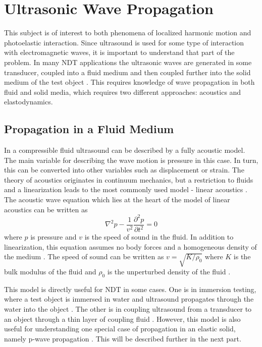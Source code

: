 \documentclass[11pt,twoside]{eitExjobb}
\begin{document}
	\section{Ultrasonic Wave Propagation}
	This subject is of interest to both phenomena of localized harmonic motion and photoelastic interaction. Since ultrasound is used for some type of interaction with electromagnetic waves, it is important to understand that part of the problem. In many NDT applications the ultrasonic waves are generated in some transducer, coupled into a fluid medium and then coupled further into the solid medium of the test object \cite{Schmerr2016}. This requires knowledge of wave propagation in both fluid and solid media, which requires two different approaches: acoustics and elastodynamics.
	
	\subsection{Propagation in a Fluid Medium}
	In a compressible fluid ultrasound can be described by a fully acoustic model. The main variable for describing the wave motion is pressure in this case. In turn, this can be converted into other variables such as displacement or strain. The theory of acoustics originates in continuum mechanics, but a restriction to fluids and a linearization leads to the most commonly used model - linear acoustics \cite{Rossing2014}. The acoustic wave equation which lies at the heart of the model of linear acoustics can be written as \cite{Rossing2014, Schmerr2016, Kaufman2000}
	\begin{equation}
		\nabla^2 p - \frac{1}{v^2} \frac{\partial^2 p}{\partial t^2} = 0
		\label{eq:th-ac-wave}
	\end{equation}
	where $p$ is pressure and $v$ is the speed of sound in the fluid. In addition to linearization, this equation assumes no body forces and a homogeneous density of the medium \cite{Rossing2014}. The speed of sound can be written as $v = \sqrt{K/\rho_0}$ where $K$ is the bulk modulus of the fluid and $\rho_0$ is the unperturbed density of the fluid \cite{Kaufman2000}.
	
	This model is directly useful for NDT in some cases. One is in immersion testing, where a test object is immersed in water and ultrasound propagates through the water into the object \cite{Schmerr2016}. The other is in coupling ultrasound from a transducer to an object through a thin layer of coupling fluid \cite{Schmerr2016}. However, this model is also useful for understanding one special case of propagation in an elastic solid, namely p-wave propagation \cite{Rossing2014}. This will be described further in the next part.
	
\end{document}
